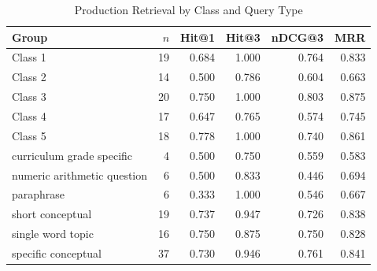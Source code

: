 \begin{table}[t]
\centering
\caption{Production Retrieval by Class and Query Type}
\label{tab:retrieval-groups}
\footnotesize
\begin{tabular}{@{}L{3.4cm}rrrrr@{}}
\toprule
Group & $n$ & Hit@1 & Hit@3 & nDCG@3 & MRR \\
\midrule
Class 1 & 19 & 0.684 & 1.000 & 0.764 & 0.833 \\
Class 2 & 14 & 0.500 & 0.786 & 0.604 & 0.663 \\
Class 3 & 20 & 0.750 & 1.000 & 0.803 & 0.875 \\
Class 4 & 17 & 0.647 & 0.765 & 0.574 & 0.745 \\
Class 5 & 18 & 0.778 & 1.000 & 0.740 & 0.861 \\
\midrule
curriculum grade specific & 4 & 0.500 & 0.750 & 0.559 & 0.583 \\
numeric arithmetic question & 6 & 0.500 & 0.833 & 0.446 & 0.694 \\
paraphrase & 6 & 0.333 & 1.000 & 0.546 & 0.667 \\
short conceptual & 19 & 0.737 & 0.947 & 0.726 & 0.838 \\
single word topic & 16 & 0.750 & 0.875 & 0.750 & 0.828 \\
specific conceptual & 37 & 0.730 & 0.946 & 0.761 & 0.841 \\
\bottomrule
\end{tabular}
\end{table}
